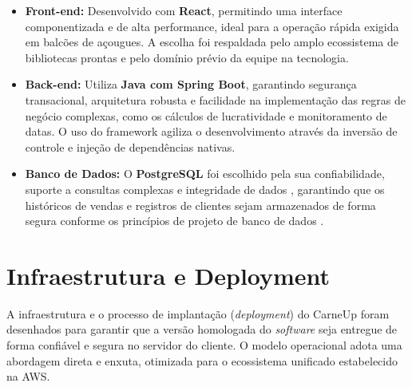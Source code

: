 \documentclass[
	12pt,				%
	openany,			%
	oneside,			%
	a4paper,			%
	english,			%
	french,				%
	spanish,			%
	brazil				%
	]{abntex2}
\begin{document}
\begin{itemize}
    \item \textbf{Front-end:} Desenvolvido com \textbf{React}, permitindo uma interface componentizada e de alta performance, ideal para a operação rápida exigida em balcões de açougues. A escolha foi respaldada pelo amplo ecossistema de bibliotecas prontas e pelo domínio prévio da equipe na tecnologia.
     
    \item \textbf{Back-end:} Utiliza \textbf{Java com Spring Boot}, garantindo segurança transacional, arquitetura robusta e facilidade na implementação das regras de negócio complexas, como os cálculos de lucratividade e monitoramento de datas. O uso do framework agiliza o desenvolvimento através da inversão de controle e injeção de dependências nativas.
     
    \item \textbf{Banco de Dados:} O \textbf{PostgreSQL} foi escolhido pela sua confiabilidade, suporte a consultas complexas e integridade de dados \cite{Postgres}, garantindo que os históricos de vendas e registros de clientes sejam armazenados de forma segura conforme os princípios de projeto de banco de dados \cite{Heuser}.
\end{itemize}
\section{Infraestrutura e Deployment}

A infraestrutura e o processo de implantação (\textit{deployment}) do CarneUp foram desenhados para garantir que a versão homologada do \textit{software} seja entregue de forma confiável e segura no servidor do cliente. O modelo operacional adota uma abordagem direta e enxuta, otimizada para o ecossistema unificado estabelecido na AWS.
\end{document}
